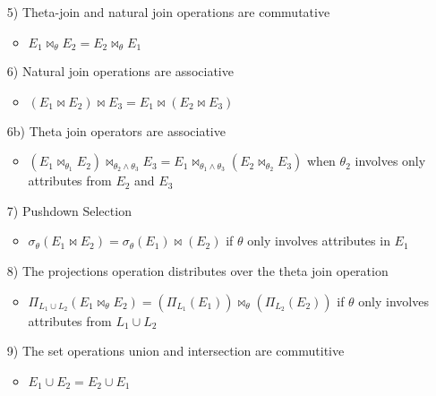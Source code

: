 \begin{itemize}
\begin{itemize}
\begin{itemize}
                    \item[5)] Theta-join and natural join operations are commutative
                        \begin{itemize}
                            \item $E_1 \bowtie_\theta E_2 = E_2 \bowtie_\theta E_1$
                        \end{itemize}
                    \item[6)] Natural join operations are associative
                        \begin{itemize}
                            \item $(E_1 \bowtie E_2) \bowtie E_3 = E_1 \bowtie (E_2 \bowtie E_3)$
                        \end{itemize}
                    \item[6b)] Theta join operators are associative
                        \begin{itemize}
                            \item $(E_1 \bowtie_{\theta_1} E_2) \bowtie_{\theta_2 \wedge \theta_3} E_3 = E_1 \bowtie_{\theta_1 \wedge \theta_3}(E_2 \bowtie_{\theta_2} E_3)$ when $\theta_2$ involves only attributes from $E_2$ and $E_3$
                        \end{itemize}
                    \item[7)] Pushdown Selection
                        \begin{itemize}
                            \item $\sigma_\theta(E_1 \bowtie E_2) = \sigma_\theta(E_1) \bowtie (E_2)$ if $\theta$ only involves attributes in $E_1$
                        \end{itemize}
                    \item[8)] The projections operation distributes over the theta join operation
                        \begin{itemize}
                            \item $\Pi_{L_1 \cup L_2}(E_1 \bowtie_\theta E_2) = (\Pi_{L_1}(E_1)) \bowtie_\theta(\Pi_{L_2}(E_2))$ if $\theta$ only involves attributes from $L_1 \cup L_2$
                        \end{itemize}
                    \item[9)] The set operations union and intersection are commutitive
                        \begin{itemize}
                            \item $E_1 \cup E_2 = E_2 \cup E_1$

\end{itemize}
\end{itemize}
\end{itemize}
\end{itemize}
